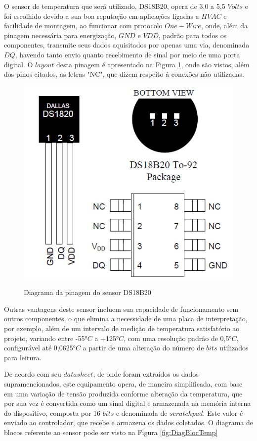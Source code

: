\documentclass[acronym,symbols]{fei}
\begin{document}
O sensor de temperatura que será utilizado, DS18B20, opera de 3,0 a 5,5 $Volts$ e foi escolhido devido a sua boa reputação em aplicações ligadas a $HVAC$ e facilidade de montagem, ao funcionar com protocolo $One-Wire$, onde, além da pinagem necessária para energização, $GND$ e $VDD$,  padrão para todos os componentes, transmite seus dados aquisitados por apenas uma via, denominada $DQ$, havendo tanto envio quanto recebimento de sinal por meio de uma porta digital.  O $layout$ desta pinagem é apresentado na Figura \ref{fig:PinTemp}, onde são vistos, além dos pinos citados, as letras "NC", que dizem respeito à conexões não utilizadas.

\begin{figure}[!htb]
\centering
    \caption{Diagrama da pinagem do sensor DS18B20}
    \includegraphics[width=0.6\linewidth]{Imagens/PinTemp.png}
    \label{fig:PinTemp}
\end{figure}

Outras vantagens deste sensor incluem sua capacidade de funcionamento sem outros componentes, o que elimina a necessidade de uma placa de interpretação, por exemplo, além de um intervalo de medição de temperatura satisfatório ao projeto, variando entre -55$°C$ a +125$°C$, com uma resolução padrão de 0,5$°C$, configurável até 0,0625$°C$ a partir de uma alteração do número de $bits$ utilizados para leitura. 

De acordo com seu $datasheet$, de onde foram extraídos os dados supramencionados, este equipamento opera, de maneira simplificada, com base em uma variação de tensão produzida conforme alteração da temperatura, que por sua vez é convertida como um sinal digital e armazenada na memória interna do dispositivo, composta por 16 $bits$ e denominada de $scratchpad$. Este valor é enviado ao controlador, que recebe e armazena os dados coletados. O diagrama de blocos referente ao sensor pode ser visto na Figura \ref{fig:DiagBlocTemp} 
\end{document}
